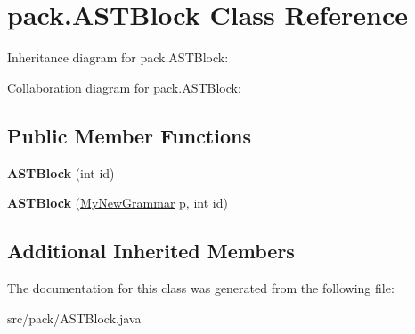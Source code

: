 \hypertarget{classpack_1_1_a_s_t_block}{}\section{pack.\+A\+S\+T\+Block Class Reference}
\label{classpack_1_1_a_s_t_block}


Inheritance diagram for pack.\+A\+S\+T\+Block\+:


Collaboration diagram for pack.\+A\+S\+T\+Block\+:
\subsection*{Public Member Functions}
\begin{DoxyCompactItemize}
\item 
{\bfseries A\+S\+T\+Block} (int id)\hypertarget{classpack_1_1_a_s_t_block_a7cf7564109deb9a7cd03ff79503b9098}{}\label{classpack_1_1_a_s_t_block_a7cf7564109deb9a7cd03ff79503b9098}

\item 
{\bfseries A\+S\+T\+Block} (\hyperlink{classpack_1_1_my_new_grammar}{My\+New\+Grammar} p, int id)\hypertarget{classpack_1_1_a_s_t_block_a8d31a116749718325b10e135284dc606}{}\label{classpack_1_1_a_s_t_block_a8d31a116749718325b10e135284dc606}

\end{DoxyCompactItemize}
\subsection*{Additional Inherited Members}


The documentation for this class was generated from the following file\+:\begin{DoxyCompactItemize}
\item 
src/pack/A\+S\+T\+Block.\+java\end{DoxyCompactItemize}
